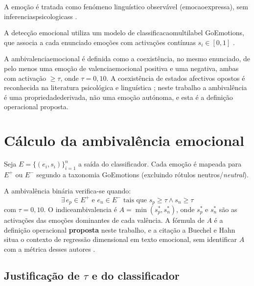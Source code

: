 A emoção é tratada como fenómeno linguístico observável (\gls{emocaoexpressa}), sem \glspl{inferenciaspsicologicas} \parencite{Wiebe2005Opinions, MohammadTurney2013Lexicon}.

A detecção emocional utiliza um modelo de \gls{classificacaomultilabel} GoEmotions, que associa a cada enunciado emoções com activações contínuas \(s_i \in [0,1]\) \parencite{Demszky2020GoEmotions}.

A \gls{ambivalenciaemocional} é definida como a coexistência, no mesmo enunciado, de pelo menos uma emoção de \gls{valenciaemocional} positiva e uma negativa, ambas com activação \(\ge \tau\), onde \(\tau = 0{,}10\). A coexistência de estados afectivos opostos é reconhecida na literatura psicológica e linguística \parencite{WielgopolanImbir2024Ambivalence}; neste trabalho a ambivalência é uma \gls{propriedadederivada}, não uma emoção autónoma, e esta é a definição operacional proposta.


\section{Cálculo da ambivalência emocional}
\label{sec:calculo}

Seja \(E = \{(e_i, s_i)\}_{i=1}^{n}\) a saída do classificador. Cada emoção é mapeada para \(E^+\) ou \(E^-\) segundo a taxonomia GoEmotions (excluindo rótulos neutros/\textit{neutral}).

A ambivalência binária verifica-se quando:
\begin{equation}
\exists \, e_p \in E^+ \text{ e } e_n \in E^- \text{ tais que } s_p \ge \tau \land s_n \ge \tau
\label{eq:ambivalencia_binaria}
\end{equation}
com \(\tau = 0{,}10\). O \Gls{indiceambivalencia} é \(A = \min(s_p^\ast, s_n^\ast)\), onde \(s_p^\ast\) e \(s_n^\ast\) são as activações das emoções dominantes de cada valência. A fórmula de \(A\) é a definição operacional \textbf{proposta} neste trabalho, e a citação a Buechel e Hahn situa o contexto de regressão dimensional em texto emocional, sem identificar \(A\) com a métrica desses autores \parencite{BuechelHahn2016Regression}.

\subsection{Justificação de \texorpdfstring{\(\tau\)}{tau} e do classificador}
\label{subsec:tau_classificador}

